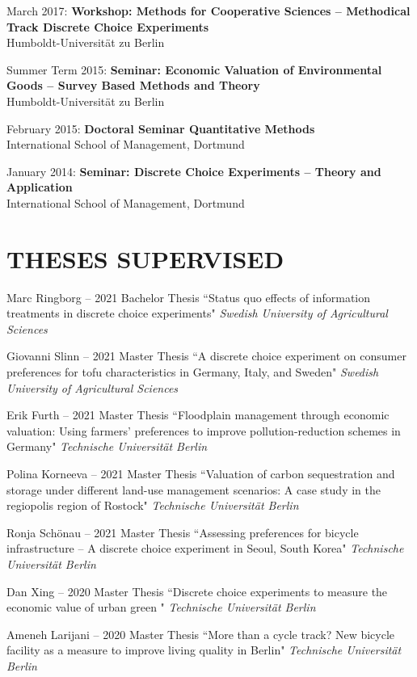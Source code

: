 \documentclass[paper=a4,fontsize=11pt]{scrartcl} %
\newcommand{\NewPart}[2]{\section*{\uppercase{#1} #2}}
\newcommand{\ThesisEntry}[5]{
		\noindent #1 -- #2 #3 ``#4" \textit{#5}}
\newcommand{\CourseEntry}[3]{
		\noindent \item{#1: \textbf{#2} \\ #3}}
\begin{document}
\begin{etaremune}
\CourseEntry{March 2017}{Workshop: Methods for Cooperative Sciences -- Methodical Track Discrete Choice Experiments}{Humboldt-Universität zu Berlin}


\CourseEntry{Summer Term 2015}{Seminar: Economic Valuation of Environmental Goods – Survey Based Methods and Theory}{Humboldt-Universität zu Berlin}

\CourseEntry{February 2015}{Doctoral Seminar Quantitative Methods}{International School of Management, Dortmund}

\CourseEntry{January 2014}{Seminar: Discrete Choice Experiments – Theory and Application}{International School of Management, Dortmund}
\end{etaremune}

\NewPart{Theses Supervised}{}
\begin{etaremune}

\item \ThesisEntry{Marc Ringborg}{2021}{Bachelor Thesis}{Status quo effects of information treatments in discrete choice experiments}{Swedish University of Agricultural Sciences}

\item \ThesisEntry{Giovanni Slinn}{2021}{Master Thesis}{A discrete choice experiment on consumer preferences for tofu characteristics in Germany, Italy, and Sweden}{Swedish University of Agricultural Sciences}

\item \ThesisEntry{Erik Furth}{2021}{Master Thesis}{Floodplain management through economic valuation: Using farmers' preferences to improve pollution-reduction schemes in Germany}{Technische Universität Berlin}

\item \ThesisEntry{Polina Korneeva}{2021}{Master Thesis}{Valuation of carbon sequestration and storage under different land-use management scenarios: A case study in the regiopolis region of Rostock}{Technische Universität Berlin}

\item \ThesisEntry{Ronja Schönau}{2021}{Master Thesis}{Assessing preferences for bicycle infrastructure –
A discrete choice experiment in Seoul, South Korea}{Technische Universität Berlin}

\item \ThesisEntry{Dan Xing}{2020}{Master Thesis}{Discrete choice experiments to measure the economic value of urban green }{Technische Universität Berlin}

\item \ThesisEntry{Ameneh Larijani}{2020}{Master Thesis}{More than a cycle track? New bicycle facility as a measure to improve living quality in Berlin}{Technische Universität Berlin}


\end{etaremune}
\end{document}
